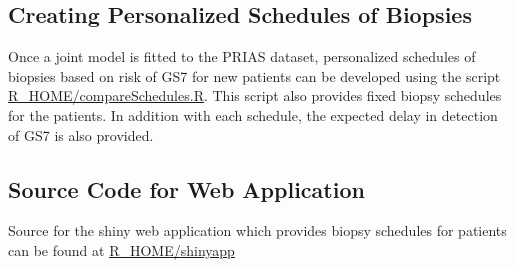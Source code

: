 \subsection{Creating Personalized Schedules of Biopsies}
Once a joint model is fitted to the PRIAS dataset, personalized schedules of biopsies based on risk of GS7 for new patients can be developed using the script \url{R_HOME/compareSchedules.R}. This script also provides fixed biopsy schedules for the patients. In addition with each schedule, the expected delay in detection of GS7 is also provided.

\subsection{Source Code for Web Application}
Source for the shiny web application which provides biopsy schedules for patients can be found at \url{R_HOME/shinyapp}
